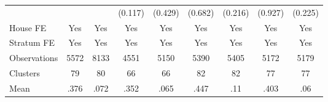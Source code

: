 {\begin{tabular}{l*{8}{c}}
                &                  &                  &  (0.117)         &  (0.429)         &  (0.682)         &  (0.216)         &  (0.927)         &  (0.225)         \\
House FE        &      Yes         &      Yes         &      Yes         &      Yes         &      Yes         &      Yes         &      Yes         &      Yes         \\
Stratum FE      &      Yes         &      Yes         &      Yes         &      Yes         &      Yes         &      Yes         &      Yes         &      Yes         \\
\midrule
Observations    &     5572         &     8133         &     4551         &     5150         &     5390         &     5405         &     5172         &     5179         \\
Clusters        &       79         &       80         &       66         &       66         &       82         &       82         &       77         &       77         \\
Mean            &     .376         &     .072         &     .352         &     .065         &     .447         &      .11         &     .403         &      .06         \\
\bottomrule
\end{tabular}
}
